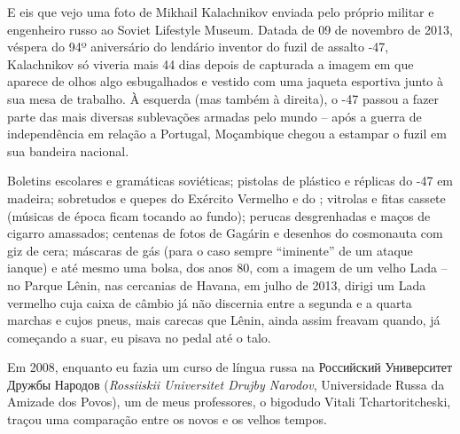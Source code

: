 E eis que vejo uma foto de Mikhail Kalachnikov enviada pelo próprio
militar e engenheiro russo ao Soviet Lifestyle Museum. Datada de 09 de
novembro de 2013, véspera do 94º aniversário do lendário inventor do
fuzil de assalto -47, Kalachnikov só viveria mais 44 dias depois de
capturada a imagem em que aparece de olhos algo esbugalhados e vestido
com uma jaqueta esportiva junto à sua mesa de trabalho. À esquerda (mas
também à direita), o -47 passou a fazer parte das mais diversas
sublevações armadas pelo mundo -- após a guerra de independência em
relação a Portugal, Moçambique chegou a estampar o fuzil em sua bandeira
nacional.

Boletins escolares e gramáticas soviéticas; pistolas de plástico e
réplicas do -47 em madeira; sobretudos e quepes do Exército Vermelho e
do ; vitrolas e fitas cassete (músicas de época ficam tocando ao
fundo); perucas desgrenhadas e maços de cigarro amassados; centenas de
fotos de Gagárin e desenhos do cosmonauta com giz de cera; máscaras de
gás (para o caso sempre ``iminente'' de um ataque ianque) e até mesmo
uma bolsa, dos anos 80, com a imagem de um velho Lada -- no Parque
Lênin, nas cercanias de Havana, em julho de 2013, dirigi um Lada
vermelho cuja caixa de câmbio já não discernia entre a segunda e a
quarta marchas e cujos pneus, mais carecas que Lênin, ainda assim
freavam quando, já começando a suar, eu pisava no pedal até o talo.

Em 2008, enquanto eu fazia um curso de língua russa na Российский
Университет Дружбы Народов (\emph{Rossiiskii Universitet Drujby
Narodov}, Universidade Russa da Amizade dos Povos), um de meus
professores, o bigodudo Vitali Tchartoritcheski, traçou uma comparação
entre os novos e os velhos tempos.

